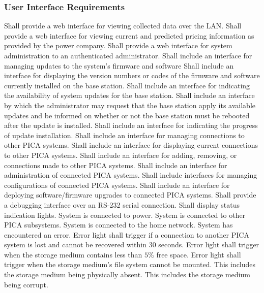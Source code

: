 \subsubsection{User Interface Requirements}
\label{sssection:base-station-ui-reqs}
\begin{outline}[enumerate]
\1 Shall provide a web interface for viewing collected data over the \ac{LAN}.
\1 Shall provide a web interface for viewing current and predicted pricing information as provided by the power company.
\1 Shall provide a web interface for system administration to an authenticated administrator.
 \2 Shall include an interface for managing updates to the system's firmware and software
  \3 Shall include an interface for displaying the version numbers or codes of the firmware and software currently installed on the base station.
  \3 Shall include an interface for indicating the availability of system updates for the base station.
  \3 Shall include an interface by which the administrator may request that the base station apply its available updates and be informed on whether or not the base station must be rebooted after the update is installed.
  \3 Shall include an interface for indicating the progress of update installation.
 \2 Shall include an interface for managing connections to other PICA systems.
  \3 Shall include an interface for displaying current connections to other PICA systems.
  \3 Shall include an interface for adding, removing, or connections made to other PICA systems.
 \2 Shall include an interface for administration of connected PICA systems.
  \3 Shall include interfaces for managing configurations of connected PICA systems.
  \3 Shall include an interface for deploying software/firmware upgrades to connected PICA systems.
\1 Shall provide a debugging interface over an RS-232 serial connection.
\1 Shall display status indication lights.
 \2 System is connected to power.
 \2 System is connected to other PICA subsystems.
 \2 System is connected to the home network.
 \2 System has encountered an error.
  \3 Error light shall trigger if a connection to another PICA system is lost and cannot be recovered within 30 seconds.
  \3 Error light shall trigger when the storage medium contains less than $5\%$ free space.
  \3 Error light shall trigger when the storage medium's file system cannot be mounted.
   \4 This includes the storage medium being physically absent.
   \4 This includes the storage medium being corrupt.

\end{outline}


